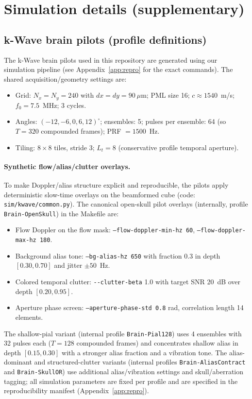 \documentclass[11pt]{article}
\DeclareRobustCommand{\path}[1]{\nolinkurl{#1}}
\newif\ifPAPERONLY
\newcommand{\SuppOrApp}[1]{\ifPAPERONLY Supplementary Material\else Appendix~\ref{#1}\fi}
\begin{document}
\section{Simulation details (supplementary)}
\label{app:sim-details}
\subsection{k-Wave brain pilots (profile definitions)}
The k-Wave brain pilots used in this repository are generated using our simulation pipeline (see \SuppOrApp{app:repro} for the exact commands). The shared acquisition/geometry settings are:
\begin{itemize}[nosep]
  \item Grid: $N_x=N_y=240$ with $dx=dy=90~\mu$m; PML size 16; $c\approx 1540$~m/s; $f_0=7.5$~MHz; 3 cycles.
  \item Angles: $(-12,-6,0,6,12)^\circ$; ensembles: 5; pulses per ensemble: 64 (so $T=320$ compounded frames); PRF $=1500$~Hz.
  \item Tiling: $8\times 8$ tiles, stride 3; $L_t=8$ (conservative profile temporal aperture).
\end{itemize}
\paragraph{Synthetic flow/alias/clutter overlays.}
To make Doppler/alias structure explicit and reproducible, the pilots apply deterministic slow-time overlays on the beamformed cube (code: \path{sim/kwave/common.py}). The canonical open-skull pilot overlays (internally, profile \texttt{Brain-OpenSkull}) in the Makefile are:
\begin{itemize}[nosep]
  \item Flow Doppler on the flow mask: \texttt{--flow-doppler-min-hz 60}, \texttt{--flow-doppler-max-hz 180}.
  \item Background alias tone: \texttt{--bg-alias-hz 650} with fraction 0.3 in depth $[0.30,0.70]$ and jitter $\pm 50$~Hz.
  \item Colored temporal clutter: \path{--clutter-beta} 1.0 with target SNR 20~dB over depth $[0.20,0.95]$.
  \item Aperture phase screen: \texttt{--aperture-phase-std 0.8} rad, correlation length 14 elements.
\end{itemize}
The shallow-pial variant (internal profile \texttt{Brain-Pial128}) uses 4 ensembles with 32 pulses each ($T=128$ compounded frames) and concentrates shallow alias in depth $[0.15,0.30]$ with a stronger alias fraction and a vibration tone. The alias-dominant and structured-clutter variants (internal profiles \texttt{Brain-AliasContract} and \texttt{Brain-SkullOR}) use additional alias/vibration settings and skull/aberration tagging; all simulation parameters are fixed per profile and are specified in the reproducibility manifest (\SuppOrApp{app:repro}).
\end{document}
